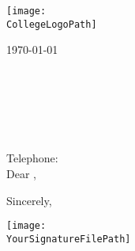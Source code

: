 \documentclass{article}
\begin{document}

\texttt{[image: \\CollegeLogoPath]} %

\vspace{0.6in} 

\today \\ \\
\ToNameDef \\
\ToJob \\
\ToWorkLocation \\
\ToAddressLineOne \\
\ToAddressLineTwo \\
Telephone: \ToPhone \\

Dear \ToNameDef,



\bigskip

Sincerely,

\texttt{[image: \\YourSignatureFilePath]}

\vspace{20pt} %

\YourName \\
\YourProfession \\
\YourWorkPlace \\
\YourEmail
\end{document}
